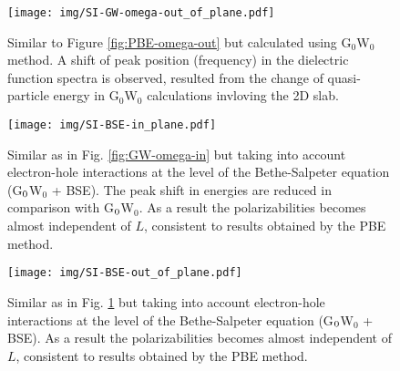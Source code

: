\documentclass[journal=ancac3,email=true,hyperref=true,keywords=false]{achemso}
\begin{document}
\begin{figure}[htbp]
  \centering
 \texttt{[image: img/SI-GW-omega-out\_of\_plane.pdf]}
 \caption{Similar to Figure \ref{fig:PBE-omega-out} but calculated
   using G$_{0}$W$_{0}$ method.  A shift of peak position (frequency)
   in the dielectric function spectra is observed, resulted from the
   change of quasi-particle energy in G$_{0}$W$_{0}$ calculations
   invloving the 2D slab.}
  \label{fig:GW-omega-out}
\end{figure}


\begin{figure}[htbp]
  \centering
 \texttt{[image: img/SI-BSE-in\_plane.pdf]}
 \caption{Similar as in Fig. \ref{fig:GW-omega-in} but taking into
   account electron-hole interactions at the level of the
   Bethe-Salpeter equation (G$_{\rm 0}$W$_{0}$ + BSE).  The peak shift
   in energies are reduced in comparison with G$_{\rm 0}$W$_{0}$. As a
   result the polarizabilities becomes almost independent of $L$,
   consistent to results obtained by the PBE method.}
  \label{fig:BSE-omega-in}
\end{figure}

\begin{figure}[htbp]
  \centering
 \texttt{[image: img/SI-BSE-out\_of\_plane.pdf]}
 \caption{Similar as in Fig. \ref{fig:GW-omega-out} but taking into
   account electron-hole interactions at the level of the
   Bethe-Salpeter equation (G$_{\rm 0}$W$_{0}$ + BSE).  As a result
   the polarizabilities becomes almost independent of $L$, consistent
   to results obtained by the PBE method.}
  \label{fig:BSE-omega-out}
\end{figure}

%
%
\end{document}
